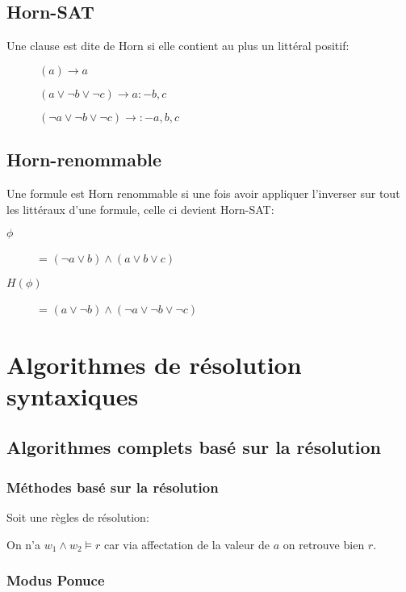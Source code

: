 \section{Horn-SAT}
Une clause est dite de Horn si elle contient au plus un littéral positif:
\begin{description}
\item[] $(a) \rightarrow a$ 
\item[] $(a \vee \neg b \vee \neg c) \rightarrow a :- b, c$
\item[] $(\neg a \vee \neg b \vee \neg c) \rightarrow :- a, b, c$
\end{description}

\section{Horn-renommable}
Une formule est Horn renommable si une fois avoir appliquer l'inverser sur tout les littéraux d'une formule, celle ci devient Horn-SAT:\\
\begin{description}
\item[$\phi$] = $(\neg a \vee b) \wedge (a \vee b \vee c)$
\item[$H(\phi)$] = $(a \vee \neg b) \wedge (\neg a \vee \neg b \vee \neg c)$
\end{description}

\pagebreak

\chapter{Algorithmes de résolution syntaxiques}
\pagebreak
\section{Algorithmes complets basé sur la résolution}
\subsection{Méthodes basé sur la résolution}

Soit une règles de résolution:

On n'a $w_1 \wedge w_2 \models r$ car via affectation de la valeur de $a$ on retrouve bien $r$.\\

\subsection{Modus Ponuce}

